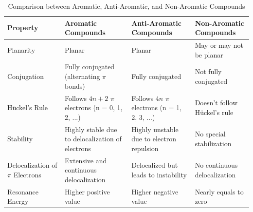 \begin{table}[!htp]
\centering
\footnotesize %
\renewcommand{\arraystretch}{1.5} %
\begin{tabular}{|>{\raggedright\arraybackslash}p{2.5cm}|>{\raggedright\arraybackslash}p{3.3cm}|>{\raggedright\arraybackslash}p{3.5cm}|>{\raggedright\arraybackslash}p{4cm}|}
\hline
\textbf{Property} & \textbf{Aromatic Compounds} & \textbf{Anti-Aromatic Compounds} & \textbf{Non-Aromatic Compounds} \\
\hline
Planarity & Planar & Planar & May or may not be planar \\
\hline
Conjugation & Fully conjugated (alternating $\pi$ bonds) & Fully conjugated & Not fully conjugated \\
\hline
Hückel's Rule & Follows $4n + 2$ $\pi$ electrons (n = 0, 1, 2, ...) & Follows $4n$ $\pi$ electrons (n = 1, 2, 3, ...) & Doesn’t follow Hückel’s rule \\
\hline
Stability & Highly stable due to delocalization of electrons & Highly unstable due to electron repulsion & No special stabilization \\
\hline
Delocalization of $\pi$ Electrons & Extensive and continuous delocalization & Delocalized but leads to instability & No continuous delocalization \\
\hline
Resonance Energy & Higher positive value & Higher negative value & Nearly equals to zero \\
\hline
\end{tabular}
\caption{Comparison between Aromatic, Anti-Aromatic, and Non-Aromatic Compounds}
\end{table}
